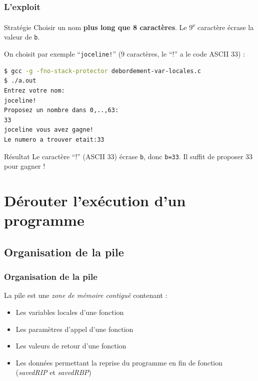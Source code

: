 \documentclass{beamer}
\newcommand{\enlight}[1]{\textit{\color{blue}#1}}
\begin{document}
\begin{frame}[fragile]
\frametitle{L'exploit}

\begin{block}{Stratégie}
Choisir un nom \textbf{plus long que 8 caractères}. Le 9\textsuperscript{e} caractère écrase la valeur de \texttt{b}.
\end{block}

On choisit par exemple ``\texttt{joceline!}'' (9 caractères, le ``!'' a le code ASCII 33) :

\begin{lstlisting}[language=bash]
$ gcc -g -fno-stack-protector debordement-var-locales.c
$ ./a.out
Entrez votre nom:
joceline!
Proposez un nombre dans 0,..,63:
33
joceline vous avez gagne!
Le numero a trouver etait:33
\end{lstlisting}

\begin{alertblock}{Résultat}
Le caractère ``!'' (ASCII 33) écrase \texttt{b}, donc \texttt{b=33}. Il suffit de proposer 33 pour gagner !
\end{alertblock}

\end{frame}


\section{Dérouter l'exécution d'un programme}

\subsection{Organisation de la pile}

\begin{frame}
\frametitle{Organisation de la pile}

La pile est une \enlight{zone de mémoire contiguë} contenant :
\begin{itemize}
\item Les variables locales d'une fonction
\item Les paramètres d'appel d'une fonction
\item Les valeurs de retour d'une fonction
\item Les données permettant la reprise du programme en fin de fonction (\enlight{savedRIP} et \enlight{savedRBP})
\end{itemize}

\end{frame}
\end{document}
